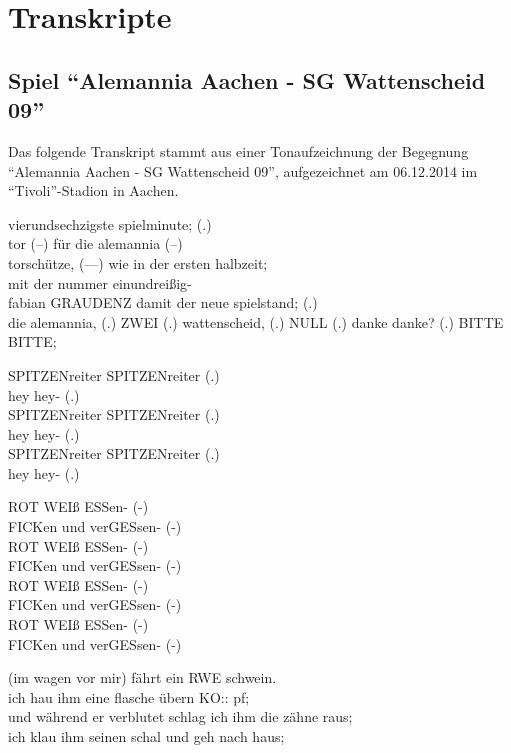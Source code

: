 \section{Transkripte}
\subsection{Spiel "`Alemannia Aachen - SG Wattenscheid 09"'}
\label{subsec:wattenscheid}
Das folgende Transkript stammt aus einer Tonaufzeichnung der Begegnung "`Alemannia Aachen - SG Wattenscheid 09"', aufgezeichnet am 06.12.2014 im "`Tivoli"'-Stadion in Aachen.

\begin{dialogue}
	 vierundsechzigste spielminute; (.) \\
	tor (--) für die alemannia (--) \\
	torschütze, (---) wie in der ersten halbzeit; \\
	mit der nummer einundreißig- \\
	fabian
	 GRAUDENZ
	 damit der neue spielstand; (.) \\
	die alemannia, (.)
	 ZWEI (.)
	 wattenscheid, (.)
	 NULL (.)
	 danke danke? (.)
	 BITTE BITTE;
	
	\bigskip
	
	 SPITZENreiter SPITZENreiter (.) \\
	hey hey- (.) \\
	SPITZENreiter SPITZENreiter (.) \\
	hey hey- (.) \\
	SPITZENreiter SPITZENreiter (.) \\
	hey hey- (.)
	
	\bigskip
	
	 ROT WEIß ESSen- (-) \\
	FICKen und verGESsen- (-) \\
	ROT WEIß ESSen- (-) \\
	FICKen und verGESsen- (-) \\
	ROT WEIß ESSen- (-) \\
	FICKen und verGESsen- (-) \\
	ROT WEIß ESSen- (-) \\
	FICKen und verGESsen- (-)

	\bigskip
	
	 (im wagen vor mir) fährt ein RWE schwein. \\
	ich hau ihm eine flasche übern KO:: pf; \\
	und während er verblutet schlag ich ihm die zähne raus; \\
	ich klau ihm seinen schal und geh nach haus;
\end{dialogue}

